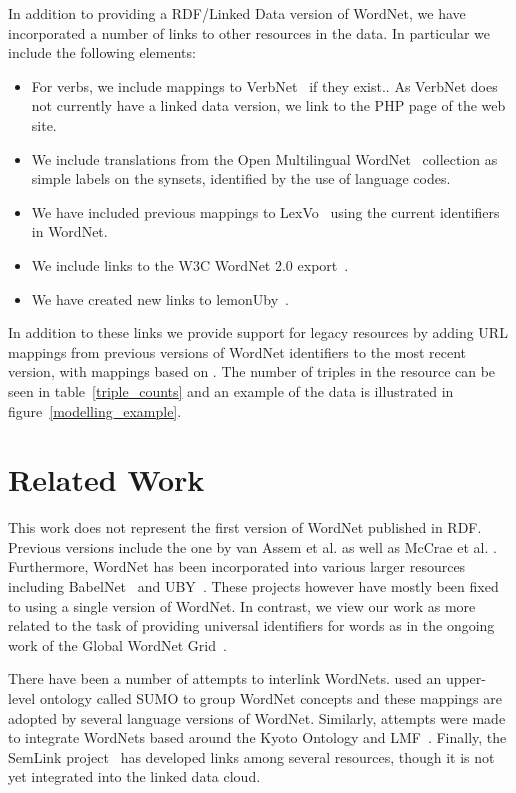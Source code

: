 \documentclass[10pt, a4paper]{article}
\begin{document}
In addition to providing a RDF/Linked Data version of WordNet, we have incorporated a number of links to other resources in the data. In particular
we include the following elements:

\begin{itemize}
  \item For verbs, we include mappings to VerbNet~\cite{schuler2005verbnet} if they exist.. As
    VerbNet does not currently have a linked data version, we link to the
    PHP page of the web site.
  \item We include translations from the Open Multilingual WordNet~\cite{bond2013linking}
    collection as simple labels on the synsets, identified by the use of
    language codes.
  \item We have included previous mappings to LexVo~\cite{de2008language} 
    using the current identifiers in WordNet.
  \item We include links to the W3C WordNet 2.0 export~\cite{van2006conversion}.
  \item We have created new links to lemonUby~\cite{eckle2014lemonuby}.
\end{itemize}

In addition to these links we provide support for legacy resources by
adding URL mappings from previous versions of WordNet identifiers to the most
recent version, with mappings based on \cite{daude2000mapping}. The number of
triples in the resource can be seen in table~\ref{triple_counts} and an example
of the data is illustrated in figure~\ref{modelling_example}.

\section{Related Work}

This work does not represent the first version of WordNet published in RDF. Previous versions
include the one by van Assem et al. \cite{van2006conversion} as well as McCrae et al. \cite{mccrae2012integrating}. Furthermore, WordNet has been
incorporated into various larger resources including
BabelNet~\cite{navigli2010babelnet,ehrmann2014} and 
UBY~\cite{gurevych2012uby,eckle2014lemonuby}. These projects however have mostly
been fixed to using a single version of WordNet. In contrast, we view our work
as more related to the task of providing universal identifiers for words as in the
ongoing work of the Global WordNet Grid~\cite{pease2008building}.  

There have been a number of attempts to interlink WordNets. 
\cite{pease2009formal} used an upper-level ontology called SUMO to group WordNet
concepts and these mappings are adopted by several language versions of WordNet.
Similarly, attempts were made to integrate WordNets based around the Kyoto
Ontology and LMF~\cite{soria2009wordnet}. Finally, the SemLink
project~\cite{palmer2009semlink} has
developed links among several resources, though it is not yet integrated into
the linked data cloud.
\end{document}
